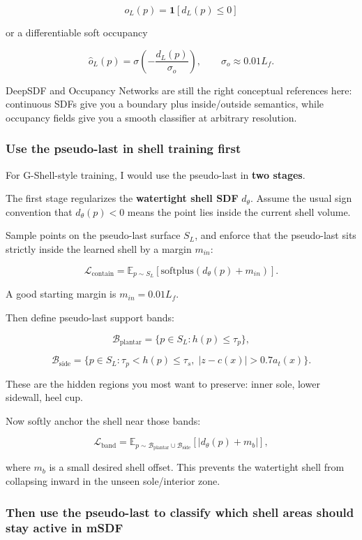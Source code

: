 \documentclass[
  10.5pt,
]{article}
\begin{document}
\[
o_L(p)=\mathbf{1}[d_L(p)\le 0]
\]

or a differentiable soft occupancy

\[
\hat o_L(p)=\sigma\!\left(-\frac{d_L(p)}{\sigma_o}\right),
\qquad \sigma_o \approx 0.01L_f.
\]

DeepSDF and Occupancy Networks are still the right conceptual references
here: continuous SDFs give you a boundary plus inside/outside semantics,
while occupancy fields give you a smooth classifier at arbitrary
resolution.

\subsubsection{Use the pseudo-last in shell training
first}\label{use-the-pseudo-last-in-shell-training-first}

For G-Shell-style training, I would use the pseudo-last in \textbf{two
stages}.

The first stage regularizes the \textbf{watertight shell SDF}
\(d_\theta\). Assume the usual sign convention that \(d_\theta(p)<0\)
means the point lies inside the current shell volume.

Sample points on the pseudo-last surface \(S_L\), and enforce that the
pseudo-last sits strictly inside the learned shell by a margin
\(m_{in}\):

\[
\mathcal L_{\text{contain}}
=
\mathbb E_{p\sim S_L}
\left[
\mathrm{softplus}(d_\theta(p)+m_{in})
\right].
\]

A good starting margin is \(m_{in}=0.01L_f\).

Then define pseudo-last support bands:

\[
\mathcal B_{\text{plantar}}
=
\{p\in S_L : h(p)\le \tau_p\},
\]

\[
\mathcal B_{\text{side}}
=
\{p\in S_L : \tau_p < h(p)\le \tau_s,\; |z-c(x)|>0.7a_t(x)\}.
\]

These are the hidden regions you most want to preserve: inner sole,
lower sidewall, heel cup.

Now softly anchor the shell near those bands:

\[
\mathcal L_{\text{band}}
=
\mathbb E_{p\sim \mathcal B_{\text{plantar}}\cup\mathcal B_{\text{side}}}
\left[
|d_\theta(p)+m_b|
\right],
\]

where \(m_b\) is a small desired shell offset. This prevents the
watertight shell from collapsing inward in the unseen sole/interior
zone.

\subsubsection{Then use the pseudo-last to classify which shell areas
should stay active in
mSDF}\label{then-use-the-pseudo-last-to-classify-which-shell-areas-should-stay-active-in-msdf}
\end{document}
